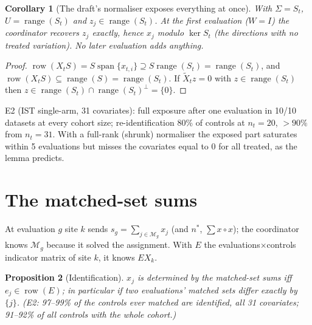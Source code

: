 \documentclass[11pt]{article}
\newtheorem{proposition}{Proposition}
\newtheorem{corollary}[proposition]{Corollary}
\theoremstyle{remark}
\DeclareMathOperator{\rowsp}{row}
\DeclareMathOperator{\range}{range}
\begin{document}
\begin{corollary}[The draft's normaliser exposes everything at once]\label{cor:oneeval}
With $\Sigma=S_t$, $U=\range(S_t)$ and $z_j\in\range(S_t)$. At the first evaluation
($W=I$) the coordinator recovers $z_j$ exactly, hence $x_j$ modulo $\ker S_t$ (the directions
with no treated variation). No later evaluation adds anything.
\end{corollary}
\begin{proof}
$\rowsp(X_tS)=S\operatorname{span}\{x_{t,i}\}\supseteq S\range(S_t)=\range(S_t)$, and
$\rowsp(X_tS)\subseteq\range(S)=\range(S_t)$. If $\tilde X_tz=0$ with $z\in\range(S_t)$ then
$z\in\range(S_t)\cap\range(S_t)^\perp=\{0\}$.
\end{proof}
\noindent E2 (IST single-arm, 31 covariates): full exposure after one evaluation in 10/10
datasets at every cohort size; re-identification 80\% of controls at $n_t=20$, $>90\%$ from
$n_t=31$. With a full-rank (shrunk) normaliser the exposed part saturates within 5
evaluations but misses the covariates equal to 0 for all treated, as the lemma predicts.

\section{The matched-set sums}

At evaluation $g$ site $k$ sends $s_g=\sum_{j\in\mathcal M_g}x_j$ (and $n^*$, $\sum x\circ x$);
the coordinator knows $\mathcal M_g$ because it solved the assignment. With $E$ the
evaluations$\times$controls indicator matrix of site $k$, it knows $EX_k$.

\begin{proposition}[Identification]\label{prop:matchedsets}
$x_j$ is determined by the matched-set sums iff $e_j\in\rowsp(E)$; in particular if two
evaluations' matched sets differ exactly by $\{j\}$. \emph{(E2: 97--99\% of the controls ever
matched are identified, all 31 covariates; 91--92\% of all controls with the whole cohort.)}
\end{proposition}
\end{document}
